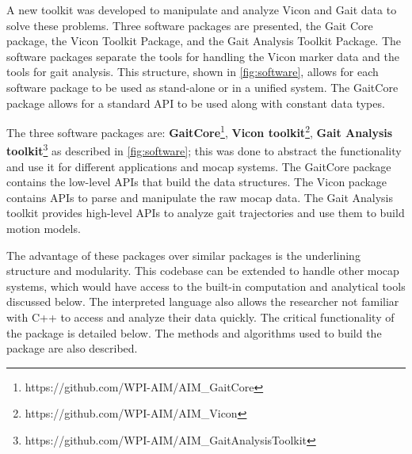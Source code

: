 A new toolkit was developed to manipulate and analyze Vicon and Gait data to solve these problems. Three software packages are presented, the Gait Core package, the Vicon Toolkit Package, and the Gait Analysis Toolkit Package. The software packages separate the tools for handling the Vicon marker data and the tools for gait analysis. This structure, shown in \autoref{fig:software}, allows for each software package to be used as stand-alone or in a unified system. The GaitCore package allows for a standard API to be used along with constant data types.   

The three software packages are: 
 \textbf{GaitCore}\footnote{https://github.com/WPI-AIM/AIM\_GaitCore}, \textbf{Vicon toolkit}\footnote{https://github.com/WPI-AIM/AIM\_Vicon},  \textbf{Gait Analysis toolkit}\footnote{https://github.com/WPI-AIM/AIM\_GaitAnalysisToolkit} as described in \autoref{fig:software}; this was done to abstract the functionality and use it for different applications and mocap systems. The GaitCore package contains the low-level APIs that build the data structures. The Vicon package contains APIs to parse and manipulate the raw mocap data. The Gait Analysis toolkit provides high-level APIs to analyze gait trajectories and use them to build motion models. 

The advantage of these packages over similar packages is the underlining structure and modularity. This codebase can be extended to handle other mocap systems, which would have access to the built-in computation and analytical tools discussed below. The interpreted language also allows the researcher not familiar with C++ to access and analyze their data quickly. The critical functionality of the package is detailed below. The methods and algorithms used to build the package are also described. 




